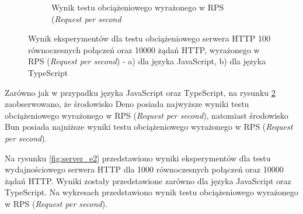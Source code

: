 \begin{figure}[H]
\begin{subfigure}[b]{0.44\textwidth}
    \caption{Wynik testu obciążeniowego wyrażonego w RPS (\textit{Request per second}}
    \label{fig:server_e1_ts}
  \end{subfigure}
  \hfill
  \caption{Wynik eksperymentów dla testu obciążeniowego serwera HTTP 100 równoczesnych połączeń oraz 10000 żądań HTTP, wyrażonego w RPS (\textit{Request per second}) - a) dla języka JavaScript, b) dla języka TypeScript}
  \label{fig:server_e1}
\end{figure}

Zarówno jak w przypadku języka JavaScript oraz TypeScript, na rysunku \ref{fig:server_e1} zaobserwowano, że środowisko Deno posiada najwyższe wyniki testu obciążeniowego wyrażonego w RPS (\textit{Request per second}), natomiast środowisko Bun posiada najniższe wyniki testu obciążeniowego wyrażonego w RPS (\textit{Request per second}).

Na rysunku \ref{fig:server_e2} przedstawiono wyniki eksperymentów dla testu wydajnościowego serwera HTTP dla 1000 równoczesnych połączeń oraz 10000 żądań HTTP. Wyniki zostały przedstawione zarówno dla języka JavaScript oraz TypeScript. Na wykresach przedstawiono wynik testu obciążeniowego wyrażonego w RPS (\textit{Request per second}).

